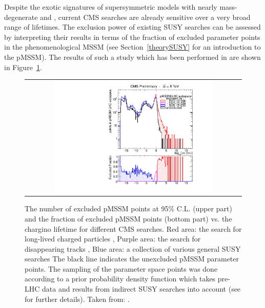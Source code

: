 
Despite the exotic signatures of supersymmetric models with nearly mass-degenerate \chipm and \chiO, current CMS searches are already sensitive over a very broad range of lifetimes.
The exclusion power of existing SUSY searches can be assessed by interpreting their results in terms of the fraction of excluded parameter points in the phenomenological MSSM (see Section~\ref{theorySUSY} for an introduction to the pMSSM). 
The results of such a study which has been performed in \cite{bib:CMS:DT_8TeV} are shown in Figure~\ref{fig:pMSSMplot}. 
\begin{figure}[!t]
  \centering 
  \begin{tabular}{c}
    \includegraphics[width=0.75\textwidth]{figures/analysis/pMSSM_vs_ctau.pdf}
  \end{tabular}
  \caption{The number of excluded pMSSM points at 95\% C.L. (upper part) and the fraction of excluded pMSSM points (bottom part) vs. the chargino lifetime for different CMS searches.
           Red area: the search for long-lived charged particles \cite{bib:CMS:HSCP_8TeV},
           Purple area: the search for disappearing tracks  \cite{bib:CMS:DT_8TeV},
           Blue area: a collection of various general SUSY searches \cite{bib:CMS:pMSSMinterpretation_7TeV_PAS}
           The black line indicates the unexcluded pMSSM parameter points.
           The sampling of the parameter space points was done according to a prior probability density function which takes pre-LHC data and results from indirect SUSY searches into account (see \cite{bib:CMS:HSCPReinterpreation_PAS} for further details).
           Taken from: \cite{bib:pMSSMplot_source_from_DT}.}
  \label{fig:pMSSMplot}
\end{figure}
